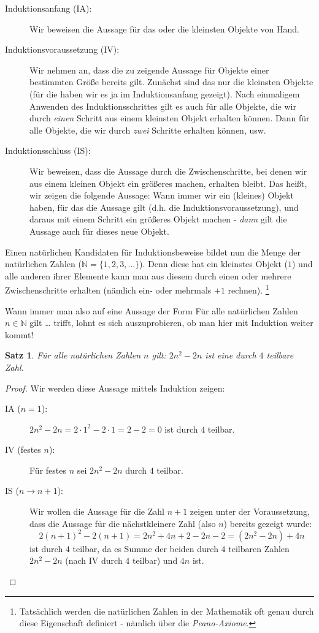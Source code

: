 \documentclass[a4paper,ngerman,12pt]{scrartcl}
\newcommand{\NN}{\mathbb{N}}
\theoremstyle{definition}
\theoremstyle{plain}
\newtheorem{satz}[defn]{Satz}
\theoremstyle{remark}
\begin{document}
\begin{description}
	\item[Induktionsanfang (IA):] Wir beweisen die Aussage für das oder die kleinsten Objekte von Hand.
	\item[Induktionsvoraussetzung (IV):] Wir nehmen an, dass die zu zeigende Aussage für Objekte einer bestimmten Größe bereits gilt. Zunächst sind das nur die kleinsten Objekte (für die haben wir es ja im Induktionsanfang gezeigt). Nach einmaligem Anwenden des Induktionsschrittes gilt es auch für alle Objekte, die wir durch \emph{einen} Schritt aus einem kleinsten Objekt erhalten können. Dann für alle Objekte, die wir durch \emph{zwei} Schritte erhalten können, usw.
	\item[Induktionsschluss (IS):] Wir beweisen, dass die Aussage durch die Zwischenschritte, bei denen wir aus einem kleinen Objekt ein größeres machen, erhalten bleibt. Das heißt, wir zeigen die folgende Aussage: Wann immer wir ein (kleines) Objekt haben, für das die Aussage gilt (d.h. die Induktionsvoraussetzung), und daraus mit einem Schritt ein größeres Objekt machen - \emph{dann} gilt die Aussage auch für dieses neue Objekt.
\end{description}


Einen natürlichen Kandidaten für Induktionsbeweise bildet nun die Menge der natürlichen Zahlen ($\mathbb{N} = \{1,2,3, \dots\}$). Denn diese hat ein kleinstes Objekt ($1$) und alle anderen ihrer Elemente kann man aus diesem durch einen oder mehrere Zwischenschritte erhalten (nämlich ein- oder mehrmals $+1$ rechnen).
\footnote{Tatsächlich werden die natürlichen Zahlen in der Mathematik oft genau durch diese Eigenschaft definiert - nämlich über die \emph{Peano-Axiome}.}

Wann immer man also auf eine Aussage der Form \glqq Für alle natürlichen Zahlen $n \in \NN$ gilt \dots\grqq{} trifft, lohnt es sich auszuprobieren, ob man hier mit Induktion weiter kommt!

\begin{satz}\label{satz:zentrierteViereckszahl}
	Für alle natürlichen Zahlen $n$ gilt: $2n^2-2n$ ist eine durch $4$ teilbare Zahl.
\end{satz}

\begin{proof}
	Wir werden diese Aussage mittels Induktion zeigen:
	\begin{description}
		\item[IA ($n=1$):] $2n^2-2n  = 2\cdot 1^2 -2 \cdot 1 = 2-2 = 0$ ist durch $4$ teilbar.
		\item[IV (festes $n$):] Für festes $n$ sei $2n^2-2n$ durch $4$ teilbar.
		\item[IS ($n \to n+1$):] Wir wollen die Aussage für die Zahl $n+1$ zeigen unter der Voraussetzung, dass die Aussage für die nächstkleinere Zahl (also $n$) bereits gezeigt wurde:
		\[2(n+1)^2-2(n+1)  = 2n^2+4n+2-2n-2 = (2n^2-2n) + 4n\]
		ist durch $4$ teilbar, da es Summe der beiden durch $4$ teilbaren Zahlen $2n^2-2n$ (nach IV durch $4$ teilbar) und $4n$ ist. \qedhere
	\end{description}
\end{proof}
\end{document}
